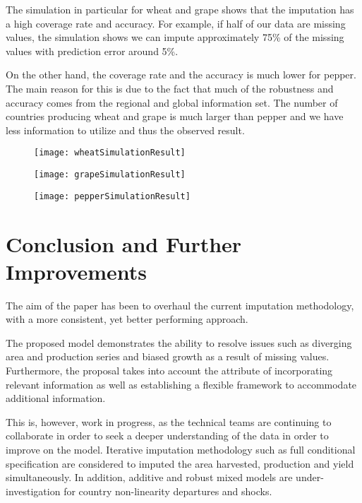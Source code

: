 \documentclass[nojss]{jss}\usepackage[]{graphicx}\usepackage[]{color}
\begin{document}
The simulation in particular for wheat and grape shows that the
imputation has a high coverage rate and accuracy. For example, if
half of our data are missing values, the simulation shows we can
impute approximately 75\% of the missing values with prediction error
around 5\%.

On the other hand, the coverage rate and the accuracy is much lower
for pepper. The main reason for this is due to the fact that much of
the robustness and accuracy comes from the regional and global
information set. The number of countries producing wheat and grape is
much larger than pepper and we have less information to utilize and
thus the observed result.




\begin{figure}[ht!]
  \centering
  \texttt{[image: wheatSimulationResult]}
\end{figure}


\begin{figure}[ht!]
  \centering
  \texttt{[image: grapeSimulationResult]}
\end{figure}

\begin{figure}[ht!]
  \centering
  \texttt{[image: pepperSimulationResult]}
\end{figure}


\FloatBarrier
\section{Conclusion and Further Improvements}
The aim of the paper has been to overhaul the current imputation
methodology, with a more consistent, yet better performing approach.

The proposed model demonstrates the ability to resolve issues such as
diverging area and production series and biased growth as a result of
missing values. Furthermore, the proposal takes into account the
attribute of incorporating relevant information as well as
establishing a flexible framework to accommodate additional
information.

This is, however, work in progress, as the technical teams are
continuing to collaborate in order to seek a deeper understanding of
the data in order to improve on the model. Iterative imputation
methodology such as full conditional specification are considered to
imputed the area harvested, production and yield simultaneously.  In
addition, additive and robust mixed models are under-investigation for
country non-linearity departures and shocks.
\end{document}
